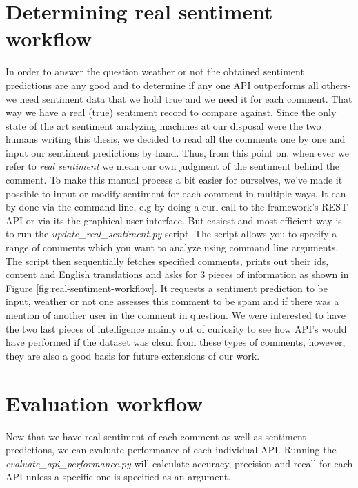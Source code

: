 \section{Determining real sentiment workflow\label{sec:determining-real-sentiment-workflow}}
In order to answer the question weather or not the obtained sentiment predictions are any good and to determine if any one API outperforms all others- we need sentiment data that we hold true and we need it for each comment. That way we have a real (true) sentiment record to compare against.
Since the only state of the art sentiment analyzing machines at our disposal were the two humans writing this thesis, we decided to read all the comments one by one and input our sentiment predictions by hand. 
Thus, from this point on, when ever we refer to \textit{real sentiment} we mean our own judgment of the sentiment behind the comment.
To make this manual process  a bit easier for ourselves, we've made it possible to input or modify sentiment for each comment in multiple ways. It can by done via the command line, e.g by doing a curl call to the framework's REST API or via its the graphical user interface. 
But easiest and most efficient way is to run the \textit{update\_real\_sentiment.py} script. The script allows you to specify a range of comments which you want to analyze using command line arguments.
The script then sequentially fetches specified comments, prints out their ids, content and English translations and asks for 3 pieces of information as shown in Figure \ref{fig:real-sentiment-workflow}. It requests a sentiment prediction to be input, weather or not one assesses this comment to be spam and if there was a mention of another user in the comment in question. 
We were interested to have the two last pieces of intelligence mainly out of curiosity to see how API's would have performed if the dataset was clean from these types of comments, however, they are also a good basis for future extensions of our work. 




\section{Evaluation workflow\label{sec:sentiment-evaluation-workflow}}
Now that we have real sentiment of each comment as well as sentiment predictions, we can evaluate performance of each individual API. Running the \textit{evaluate\_api\_performance.py} will calculate accuracy, precision and recall for each API unless a specific one is specified as an argument. 
